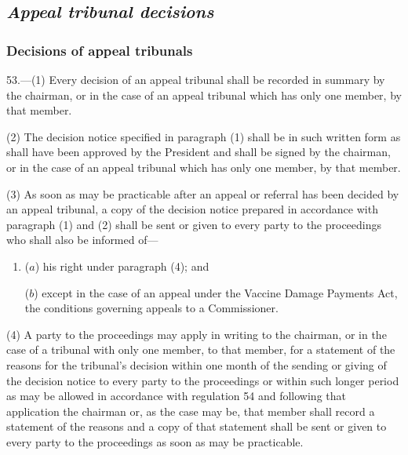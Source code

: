 \documentclass[12pt,a4paper]{article}
\begin{document}
\subsection{\itshape Appeal tribunal decisions}

\subsubsection[53. Decisions of appeal tribunals]{Decisions of appeal tribunals}

53.—(1) Every decision of an appeal tribunal shall be recorded in summary by the chairman, or in the case of an appeal tribunal which has only one member, by that member.

(2) The decision notice specified in paragraph (1) shall be in such written form as shall have been approved by the President and shall be signed by the chairman, or in the case of an appeal tribunal which has only one member, by that member.

(3) As soon as may be practicable after an appeal or referral has been decided by an appeal tribunal, a copy of the decision notice prepared in accordance with paragraph (1) and (2) shall be sent or given to every party to the proceedings who shall also be informed of—
\begin{enumerate}\item[]
($a$) his right under paragraph (4); and


($b$) except in the case of an appeal under the Vaccine Damage Payments Act, the conditions governing appeals to a Commissioner.
\end{enumerate}

(4) A party to the proceedings may apply in writing to the chairman, or in the case of a tribunal with only one member, to that member, for 
a statement of the reasons for the tribunal’s decision within one month of the sending or giving of the decision notice to every party to the proceedings or within such longer period as may be allowed in accordance with regulation 54
and following that application the chairman or, as the case may be, that member shall record a statement of the reasons and a copy of that statement shall be sent or given to every party to the proceedings as soon as may be practicable.  %
\end{document}
